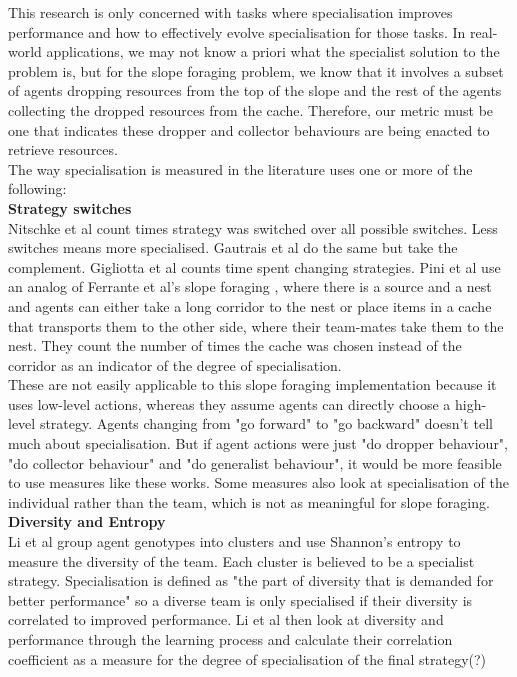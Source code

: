 \documentclass[12pt]{article}
\begin{document}
This research is only concerned with tasks where specialisation improves performance and how to effectively evolve specialisation for those tasks.
In real-world applications, we may not know a priori what the specialist solution to the problem is, but for the slope foraging problem, we know that it involves a subset of agents dropping resources from the top of the slope and the rest of the agents collecting the dropped resources from the cache.
Therefore, our metric must be one that indicates these dropper and collector behaviours are being enacted to retrieve resources.\\

The way specialisation is measured in the literature uses one or more of the following:\\

\textbf{Strategy switches}\\

Nitschke et al \cite{nitschke:SEC:2012} count times strategy was switched over all possible switches. Less switches means more specialised.
Gautrais et al \cite{gautrais:JTB:2002} do the same but take the complement.
Gigliotta  et al \cite{gigliotta:Neurocomputing:2018} counts time spent changing strategies.
Pini et al \cite{pini:SI:2011, pini:ICSI:2012} use an analog of Ferrante et al's slope foraging \cite{ferrante:PLoSCB:2015}, where there is a source and a nest and agents can either take a long corridor to the nest or place items in a cache that transports them to the other side, where their team-mates take them to the nest.
They count the number of times the cache was chosen instead of the corridor as an indicator of the degree of specialisation.\\

These are not easily applicable to this slope foraging implementation because it uses low-level actions, whereas they assume agents can directly choose a high-level strategy. 
Agents changing from "go forward" to "go backward" doesn't tell much about specialisation. But if agent actions were just "do dropper behaviour", "do collector behaviour" and "do generalist behaviour", it would be more feasible to use measures like these works. Some measures also look at specialisation of the individual rather than the team, which is not as meaningful for slope foraging.\\

\textbf{Diversity and Entropy}\\

Li et al \cite{li:AB:2004} group agent genotypes into clusters and use Shannon's entropy to measure the diversity of the team. Each cluster is believed to be a specialist strategy. Specialisation is defined as "the part of diversity that is demanded for better performance" so a diverse team is only specialised if their diversity is correlated to improved performance. Li et al  then look at diversity and performance through the learning process and calculate their correlation coefficient as a measure for the degree of specialisation of the final strategy(?)\\
\end{document}
